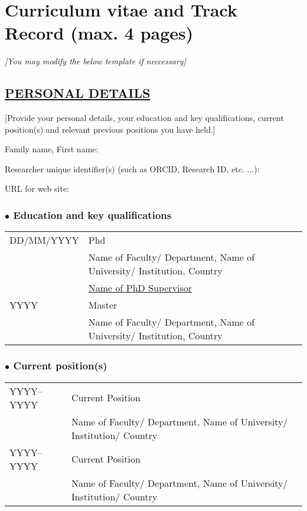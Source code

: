 \documentclass{article}
\begin{document}
\newpage

\section{Curriculum vitae and Track Record (max. 4 pages)}

\textit{[You may modify the below template if neccessary]}

\subsection*{\underline{PERSONAL DETAILS}}

[Provide your personal details, your education and key qualifications, current position(s) and relevant previous positions you have held.]


\noindent Family name, First name:

\noindent Researcher unique identifier(s) (such as ORCID, Research ID, etc. ...):

\noindent URL for web site: 		

\subsubsection*{$\bullet$ Education and key qualifications}

\begin{tabular}{m{8em} m{32em}}
     DD/MM/YYYY & Phd \\
                & Name of Faculty/ Department, Name of University/ Institution, Country \\
		& \underline{Name of PhD Supervisor} \\
     YYYY       & Master \\
                & Name of Faculty/ Department, Name of University/ Institution, Country \\
\end{tabular}

\subsubsection*{$\bullet$ Current position(s)}

\begin{tabular}{m{8em} m{32em}}
     YYYY--YYYY	& Current Position \\
                & Name of Faculty/ Department, Name of University/ Institution/ Country \\
     YYYY--YYYY	& Current Position \\
                & Name of Faculty/ Department, Name of University/ Institution/ Country \\
\end{tabular}
\end{document}
